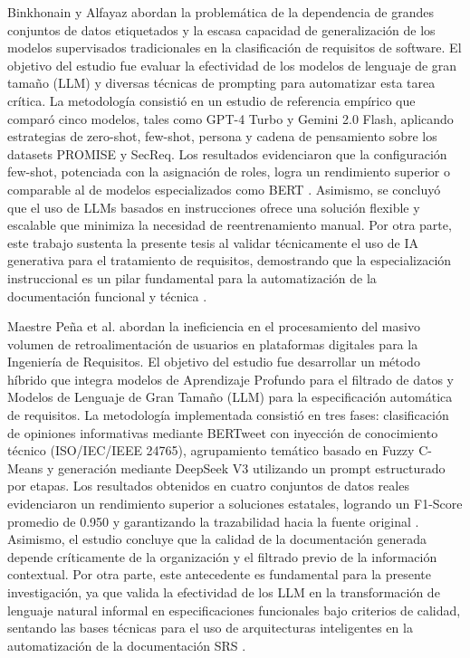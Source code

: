 Binkhonain y Alfayaz \cite{Binkhonain2025} abordan la problemática de la dependencia de grandes conjuntos de datos etiquetados y la escasa capacidad 
de generalización de los modelos supervisados tradicionales en la clasificación de requisitos de software. El objetivo del estudio fue evaluar la 
efectividad de los modelos de lenguaje de gran tamaño (LLM) y diversas técnicas de prompting para automatizar esta tarea crítica. La metodología 
consistió en un estudio de referencia empírico que comparó cinco modelos, tales como GPT-4 Turbo y Gemini 2.0 Flash, aplicando estrategias de zero-shot, 
few-shot, persona y cadena de pensamiento sobre los datasets PROMISE y SecReq. Los resultados evidenciaron que la configuración few-shot, potenciada con 
la asignación de roles, logra un rendimiento superior o comparable al de modelos especializados como BERT \cite{Binkhonain2025}. Asimismo, se concluyó 
que el uso de LLMs basados en instrucciones ofrece una solución flexible y escalable que minimiza la necesidad de reentrenamiento manual. Por otra parte, 
este trabajo sustenta la presente tesis al validar técnicamente el uso de IA generativa para el tratamiento de requisitos, demostrando que la 
especialización instruccional es un pilar fundamental para la automatización de la documentación funcional y técnica \cite{Binkhonain2025}.


Maestre Peña et al. \cite{Pea2026} abordan la ineficiencia en el procesamiento del masivo volumen de retroalimentación de usuarios en plataformas 
digitales para la Ingeniería de Requisitos. El objetivo del estudio fue desarrollar un método híbrido que integra modelos de Aprendizaje Profundo 
para el filtrado de datos y Modelos de Lenguaje de Gran Tamaño (LLM) para la especificación automática de requisitos. La metodología implementada 
consistió en tres fases: clasificación de opiniones informativas mediante BERTweet con inyección de conocimiento técnico (ISO/IEC/IEEE 24765), 
agrupamiento temático basado en Fuzzy C-Means y generación mediante DeepSeek V3 utilizando un prompt estructurado por etapas. Los resultados obtenidos 
en cuatro conjuntos de datos reales evidenciaron un rendimiento superior a soluciones estatales, logrando un F1-Score promedio de 0.950 y garantizando 
la trazabilidad hacia la fuente original \cite{Pea2026}. Asimismo, el estudio concluye que la calidad de la documentación generada depende críticamente 
de la organización y el filtrado previo de la información contextual. Por otra parte, este antecedente es fundamental para la presente investigación, 
ya que valida la efectividad de los LLM en la transformación de lenguaje natural informal en especificaciones funcionales bajo criterios de calidad, 
sentando las bases técnicas para el uso de arquitecturas inteligentes en la automatización de la documentación SRS \cite{Pea2026}.


